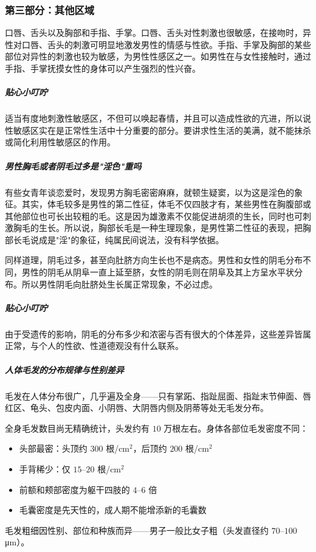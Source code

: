 \subsubsection{第三部分：其他区域}

口唇、舌头以及胸部和手指、手掌。口唇、舌头对性刺激也很敏感，在接吻时，异性对口唇、舌头的刺激可明显地激发男性的情感与性欲。手指、手掌及胸部的某些部位对异性的刺激也较为敏感，为男性性感区之一。如男性在与女性接触时，通过手指、手掌抚摸女性的身体可以产生强烈的性兴奋。

\subparagraph{贴心小叮咛}

适当有度地刺激性敏感区，不但可以唤起春情，并且可以造成性欲的亢进，所以说性敏感区实在是正常性生活中十分重要的部分。要讲求性生活的美满，就不能抹杀或简化利用性敏感区的作用。

\subparagraph{男性胸毛或者阴毛过多是"淫色"重吗}

有些女青年谈恋爱时，发现男方胸毛密密麻麻，就顿生疑窦，以为这是淫色的象征。其实，体毛较多是男性的第二性征，体毛不仅四肢才有，某些男性在胸腹部或其他部位也可长出较粗的毛。这是因为雄激素不仅能促进胡须的生长，同时也可刺激胸毛的生长。所以说，胸部长毛是一种生理现象，是男性第二性征的表现，把胸部长毛说成是"淫"的象征，纯属民间说法，没有科学依据。

同样道理，阴毛过多，甚至向肚脐方向生长也不是病态。男性和女性的阴毛分布不同，男性的阴毛从阴阜一直上延至脐，女性的阴毛则在阴阜及其上方呈水平状分布。所以男性阴毛向肚脐处生长属正常现象，不必过虑。

\subparagraph{贴心小叮咛}

由于受遗传的影响，阴毛的分布多少和浓密与否有很大的个体差异，这些差异皆属正常，与个人的性欲、性道德观没有什么联系。

\subparagraph{人体毛发的分布规律与性别差异}

毛发在人体分布很广，几乎遍及全身——只有掌跖、指趾屈面、指趾末节伸面、唇红区、龟头、包皮内面、小阴唇、大阴唇内侧及阴蒂等处无毛发分布。

全身毛发数目尚无精确统计，头发约有 $10$ 万根左右。身体各部位毛发密度不同：
\begin{itemize}
	\item 头部最密：头顶约 $300$ 根/cm$^2$，后顶约 $200$ 根/cm$^2$
	\item 手背稀少：仅 $15$--$20$ 根/cm$^2$
	\item 前额和颊部密度为躯干四肢的 $4$--$6$ 倍
	\item 毛囊密度是先天性的，成人期不能增添新的毛囊数
\end{itemize}

毛发粗细因性别、部位和种族而异——男子一般比女子粗（头发直径约 $70$--$100$ μm）。

